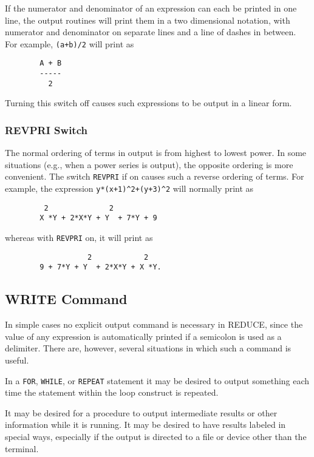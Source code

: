 \documentclass[11pt,letterpaper]{book}
\makeatletter
\newcommand{\REDUCE}{REDUCE}
\newcommand{\underscore}{\_}
\newcommand{\ttindex}[1]{{\renewcommand{\_}{\protect\underscore}%
                          \index{#1@{\tt #1}}}}
\makeatother
\begin{document}
If the numerator and denominator of an expression can each be printed in
one line, the output routines will print them in a two dimensional
notation, with numerator and denominator on separate lines and a line of
dashes in between. For example, {\tt (a+b)/2} will print as
{\small\begin{verbatim}
        A + B
        -----
          2
\end{verbatim}}
Turning this switch off causes such expressions to be output in a linear
form.

\subsubsection{REVPRI Switch}\ttindex{REVPRI}

The normal ordering of terms in output is from highest to lowest power.
In some situations (e.g., when a power series is output), the opposite
ordering is more convenient.  The switch {\tt REVPRI} if on causes such a
reverse ordering of terms.  For example, the expression
{\tt y*(x+1)\verb|^|2+(y+3)\verb|^|2} will normally print as
{\small\begin{verbatim}
         2              2
        X *Y + 2*X*Y + Y  + 7*Y + 9
\end{verbatim}}
whereas with {\tt REVPRI} on, it will print as
{\small\begin{verbatim}
                   2            2
        9 + 7*Y + Y  + 2*X*Y + X *Y.
\end{verbatim}}

\subsection{WRITE Command}\ttindex{WRITE}

In simple cases no explicit output command is necessary in
{\REDUCE}, since the value of any expression is automatically printed if a
semicolon is used as a delimiter.  There are, however, several situations
in which such a command is useful.

In a {\tt FOR}, {\tt WHILE}, or {\tt REPEAT} statement it may be desired
to output something each time the statement within the loop construct is
repeated.

It may be desired for a procedure to output intermediate results or other
information while it is running. It may be desired to have results labeled
in special ways, especially if the output is directed to a file or device
other than the terminal.
\end{document}
